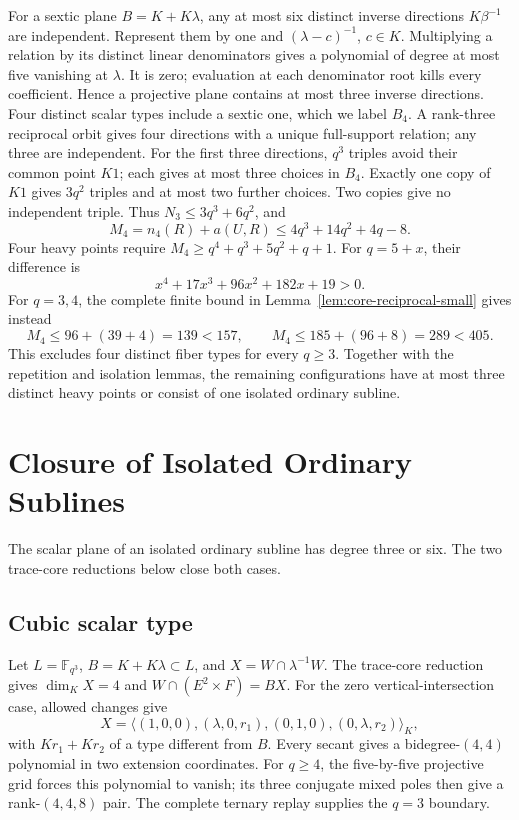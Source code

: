 \documentclass[12pt,letterpaper,onecolumn]{article}
\theoremstyle{definition}
\theoremstyle{remark}
\begin{document}
For a sextic plane \(B=K+K\lambda\), any at most six distinct inverse directions \(K\beta^{-1}\) are independent.
Represent them by one and \((\lambda-c)^{-1}\), \(c\in K\).
Multiplying a relation by its distinct linear denominators gives a polynomial of degree at most five vanishing at \(\lambda\).
It is zero; evaluation at each denominator root kills every coefficient.
Hence a projective plane contains at most three inverse directions.
Four distinct scalar types include a sextic one, which we label \(B_4\).
A rank-three reciprocal orbit gives four directions with a unique full-support relation; any three are independent.
For the first three directions, \(q^3\) triples avoid their common point \(K1\); each gives at most three choices in \(B_4\).
Exactly one copy of \(K1\) gives \(3q^2\) triples and at most two further choices. Two copies give no independent triple.
Thus \(N_3\le3q^3+6q^2\), and
\[
M_4=n_4(R)+a(U,R)\le4q^3+14q^2+4q-8.
\]
Four heavy points require \(M_4\ge q^4+q^3+5q^2+q+1\).
For \(q=5+x\), their difference is
\[
x^4+17x^3+96x^2+182x+19>0.
\]
For \(q=3,4\), the complete finite bound in Lemma~\ref{lem:core-reciprocal-small} gives instead
\[
M_4\le96+(39+4)=139<157,
\qquad M_4\le185+(96+8)=289<405.
\]
This excludes four distinct fiber types for every \(q\ge3\).
Together with the repetition and isolation lemmas, the remaining configurations have at most three distinct heavy points or consist of one isolated ordinary subline.

\section{Closure of Isolated Ordinary Sublines}
The scalar plane of an isolated ordinary subline has degree three or six.
The two trace-core reductions below close both cases.

\subsection{Cubic scalar type}
Let \(L=\mathbb F_{q^3}\), \(B=K+K\lambda\subset L\), and
\(X=W\cap\lambda^{-1}W\).  The trace-core reduction gives
\(\dim_KX=4\) and \(W\cap(E^2\times F)=BX\).
For the zero vertical-intersection case, allowed changes give
\[
X=\langle(1,0,0),(\lambda,0,r_1),(0,1,0),(0,\lambda,r_2)\rangle_K,
\]
with \(Kr_1+Kr_2\) of a type different from \(B\).  Every secant gives a
bidegree-\((4,4)\) polynomial in two extension coordinates.  For \(q\ge4\),
the five-by-five projective grid forces this polynomial to vanish; its three
conjugate mixed poles then give a rank-\((4,4,8)\) pair.  The complete
ternary replay supplies the \(q=3\) boundary.
\end{document}
